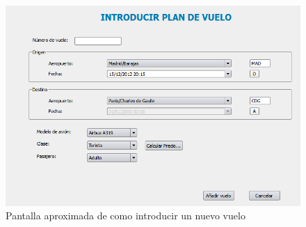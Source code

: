 \begin{figure}[ht]\centering
	\includegraphics[scale=.6]{imagenes/introducirPlanDeVueloImagen.png}
	\caption{Pantalla aproximada de como introducir un nuevo vuelo}
\end{figure}
